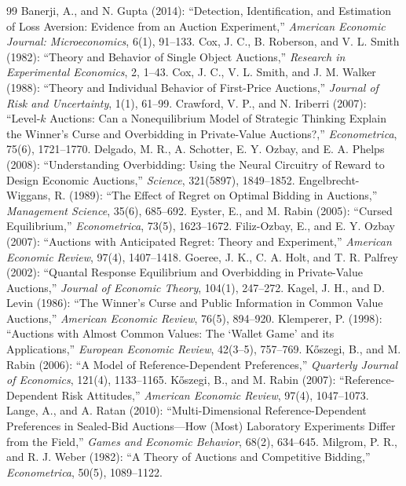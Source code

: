 \documentclass[11pt,a4paper]{article}
\theoremstyle{remark}
\begin{document}
\begin{thebibliography}{99}
Banerji, A., and N. Gupta (2014): ``Detection, Identification, and Estimation of
Loss Aversion: Evidence from an Auction Experiment,'' \emph{American Economic
Journal: Microeconomics}, 6(1), 91--133.
Cox, J. C., B. Roberson, and V. L. Smith (1982): ``Theory and Behavior of Single
Object Auctions,'' \emph{Research in Experimental Economics}, 2, 1--43.
Cox, J. C., V. L. Smith, and J. M. Walker (1988): ``Theory and Individual Behavior
of First-Price Auctions,'' \emph{Journal of Risk and Uncertainty}, 1(1), 61--99.
Crawford, V. P., and N. Iriberri (2007): ``Level-$k$ Auctions: Can a Nonequilibrium
Model of Strategic Thinking Explain the Winner's Curse and Overbidding in
Private-Value Auctions?,'' \emph{Econometrica}, 75(6), 1721--1770.
Delgado, M. R., A. Schotter, E. Y. Ozbay, and E. A. Phelps (2008): ``Understanding
Overbidding: Using the Neural Circuitry of Reward to Design Economic Auctions,''
\emph{Science}, 321(5897), 1849--1852.
Engelbrecht-Wiggans, R. (1989): ``The Effect of Regret on Optimal Bidding in
Auctions,'' \emph{Management Science}, 35(6), 685--692.
Eyster, E., and M. Rabin (2005): ``Cursed Equilibrium,'' \emph{Econometrica}, 73(5),
1623--1672.
Filiz-Ozbay, E., and E. Y. Ozbay (2007): ``Auctions with Anticipated Regret: Theory
and Experiment,'' \emph{American Economic Review}, 97(4), 1407--1418.
Goeree, J. K., C. A. Holt, and T. R. Palfrey (2002): ``Quantal Response Equilibrium
and Overbidding in Private-Value Auctions,'' \emph{Journal of Economic Theory},
104(1), 247--272.
Kagel, J. H., and D. Levin (1986): ``The Winner's Curse and Public Information in
Common Value Auctions,'' \emph{American Economic Review}, 76(5), 894--920.
Klemperer, P. (1998): ``Auctions with Almost Common Values: The `Wallet Game' and
its Applications,'' \emph{European Economic Review}, 42(3--5), 757--769.
K\H{o}szegi, B., and M. Rabin (2006): ``A Model of Reference-Dependent
Preferences,'' \emph{Quarterly Journal of Economics}, 121(4), 1133--1165.
K\H{o}szegi, B., and M. Rabin (2007): ``Reference-Dependent Risk Attitudes,''
\emph{American Economic Review}, 97(4), 1047--1073.
Lange, A., and A. Ratan (2010): ``Multi-Dimensional Reference-Dependent Preferences
in Sealed-Bid Auctions---How (Most) Laboratory Experiments Differ from the Field,''
\emph{Games and Economic Behavior}, 68(2), 634--645.
Milgrom, P. R., and R. J. Weber (1982): ``A Theory of Auctions and Competitive
Bidding,'' \emph{Econometrica}, 50(5), 1089--1122.
\end{thebibliography}
\end{document}
